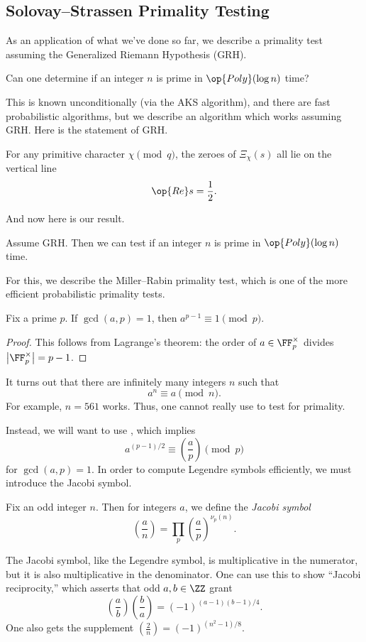 \documentclass[../notes.tex]{subfiles}
\begin{document}
\subsection{Solovay--Strassen Primality Testing}
As an application of what we've done so far, we describe a primality test assuming the Generalized Riemann Hypothesis (GRH).
\begin{ques}
	Can one determine if an integer $n$ is prime in $\op{Poly}(\log n)$ time?
\end{ques}
This is known unconditionally (via the AKS algorithm), and there are fast probabilistic algorithms, but we describe an algorithm which works assuming GRH. Here is the statement of GRH.
\begin{conj}
	For any primitive character $\chi\pmod q$, the zeroes of $\Xi_\chi(s)$ all lie on the vertical line
	\[\op{Re}s=\frac12.\]
\end{conj}
And now here is our result.
\begin{theorem}
	Assume GRH. Then we can test if an integer $n$ is prime in $\op{Poly}(\log n)$ time.
\end{theorem}
For this, we describe the Miller--Rabin primality test, which is one of the more efficient probabilistic primality tests.
\begin{lemma} \label{lem:fermat-little}
	Fix a prime $p$. If $\gcd(a,p)=1$, then $a^{p-1}\equiv1\pmod p$.
\end{lemma}
\begin{proof}
	This follows from Lagrange's theorem: the order of $a\in\FF_p^\times$ divides $\left|\FF_p^\times\right|=p-1$.
\end{proof}
\begin{remark}
	It turns out that there are infinitely many integers $n$ such that
	\[a^n\equiv a\pmod n.\]
	For example, $n=561$ works. Thus, one cannot really use  to test for primality.
\end{remark}
Instead, we will want to use , which implies
\[a^{(p-1)/2}\equiv\left(\frac ap\right)\pmod p\]
for $\gcd(a,p)=1$. In order to compute Legendre symbols efficiently, we must introduce the Jacobi symbol.
\begin{definition}[Jacobi]
	Fix an odd integer $n$. Then for integers $a$, we define the \textit{Jacobi symbol}
	\[\left(\frac an\right)=\prod_p\left(\frac ap\right)^{\nu_p(n)}.\]
\end{definition}
\begin{remark} \label{rem:jacobi-recip}
	The Jacobi symbol, like the Legendre symbol, is multiplicative in the numerator, but it is also multiplicative in the denominator. One can use this to show ``Jacobi reciprocity,'' which asserts that odd $a,b\in\ZZ$ grant
	\[\left(\frac ab\right)\left(\frac ba\right)=(-1)^{(a-1)(b-1)/4}.\]
	One also gets the supplement $\left(\frac2n\right)=(-1)^{\left(n^2-1\right)/8}$.
\end{remark}
\end{document}

